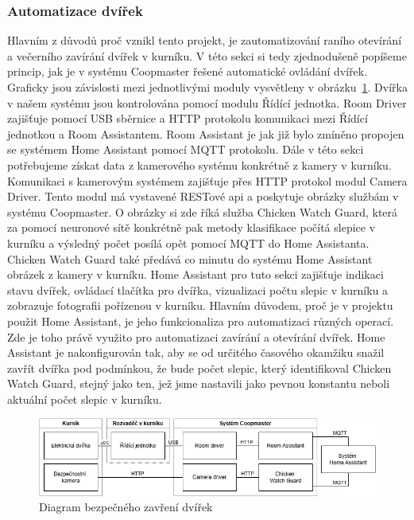 \subsubsection{Automatizace dvířek}
Hlavním z důvodů proč vznikl tento projekt, je zautomatizování raního otevírání a večerního zavírání dvířek v kurníku.
V této sekci si tedy zjednodušeně popíšeme princip, jak je v systému Coopmaster řešené automatické ovládání dvířek.
Graficky jsou závislosti mezi jednotlivými moduly vysvětleny v obrázku~\ref{fig:automatizace_dvirek}.\newline
Dvířka v našem systému jsou kontrolována pomocí modulu Řídící jednotka.
Room Driver zajišťuje pomocí USB sběrnice a HTTP protokolu komunikaci mezi Řídící jednotkou a Room Assistantem.
Room Assistant je jak již bylo zmíněno propojen se systémem Home Assistant pomocí MQTT protokolu.
Dále v této sekci potřebujeme získat data z kamerového systému konkrétně z kamery v kurníku.
Komunikaci s kamerovým systémem zajišťuje přes HTTP protokol modul Camera Driver.
Tento modul má vystavené RESTové api a poskytuje obrázky službám v systému Coopmaster.
O obrázky si zde říká služba Chicken Watch Guard, která za pomocí neuronové sítě konkrétně pak metody klasifikace počítá slepice v kurníku a výsledný počet posílá opět pomocí MQTT do Home Assistanta.
Chicken Watch Guard také předává co minutu do systému Home Assistant obrázek z kamery v kurníku.
Home Assistant pro tuto sekci zajišťuje indikaci stavu dvířek, ovládací tlačítka pro dvířka, vizualizaci počtu slepic v kurníku a zobrazuje fotografii pořízenou v kurníku.
Hlavním důvodem, proč je v projektu použit Home Assistant, je jeho funkcionaliza pro automatizaci různých operací.
Zde je toho právě využito pro automatizaci zavírání a otevírání dvířek.
Home Assistant je nakonfigurován tak, aby se od určitého časového okamžiku snažil zavřít dvířka pod podmínkou, že bude počet slepic, který identifikoval Chicken Watch Guard, stejný jako ten, jež jsme nastavili jako pevnou konstantu neboli aktuální počet slepic v kurníku.
\begin{figure}[h]
    \centering
    \includegraphics[width=\textwidth]{img/automatizace_dvirek}
    \caption{Diagram bezpečného zavření dvířek}
    \label{fig:automatizace_dvirek}
\end{figure}

